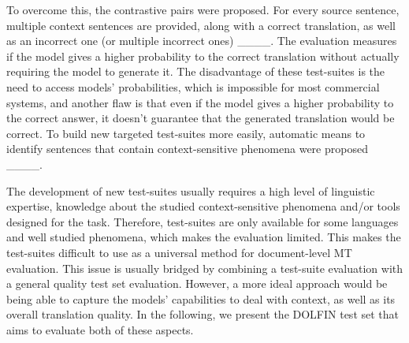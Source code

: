 To overcome this, the contrastive pairs were proposed. For every source sentence, multiple context sentences are provided, along with a correct translation, as well as an incorrect one (or multiple incorrect ones) ____. The evaluation measures if the model gives a higher probability to the correct translation without actually requiring the model to generate it. The disadvantage of these test-suites is the need to access models' probabilities, which is impossible for most commercial systems, and another flaw is that even if the model gives a higher probability to the correct answer, it doesn't guarantee that the generated translation would be correct. 
To build new targeted test-suites more easily, automatic means to identify sentences that contain context-sensitive phenomena were proposed  ____.

The development of new test-suites usually requires a high level of linguistic expertise, knowledge about the studied context-sensitive phenomena and/or tools designed for the task. Therefore, test-suites are only available for some languages and well studied phenomena, which makes the evaluation limited. This makes the test-suites difficult to use as a universal method for document-level MT evaluation. This issue is usually bridged by combining a test-suite evaluation with a general quality test set evaluation. However, a more ideal approach would be being able to capture the models' capabilities to deal with context, as well as its overall translation quality. 
In the following, we present the DOLFIN test set that aims to evaluate both of these aspects.